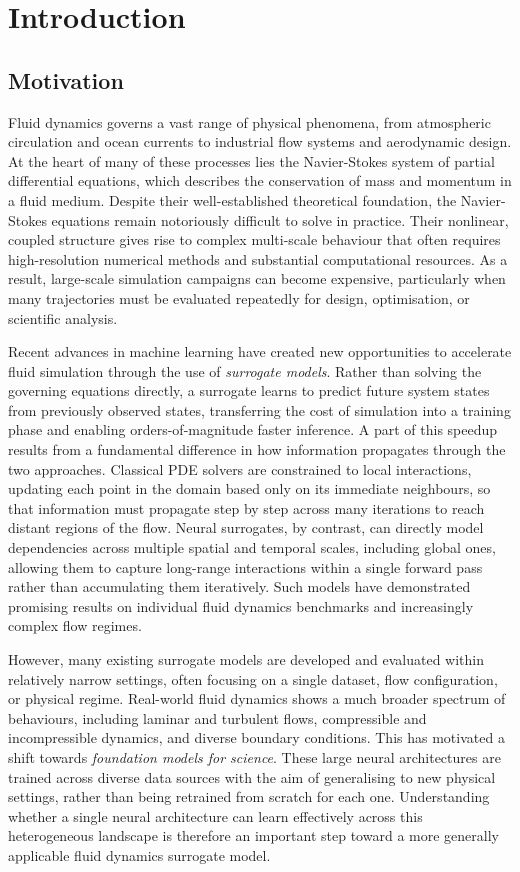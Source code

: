\chapter{Introduction}\label{ch:introduction}

\section{Motivation}
Fluid dynamics governs a vast range of physical phenomena, from atmospheric circulation and ocean currents to industrial flow systems and aerodynamic design. At the heart of many of these processes lies the Navier-Stokes system of partial differential equations, which describes the conservation of mass and momentum in a fluid medium. Despite their well-established theoretical foundation, the Navier-Stokes equations remain notoriously difficult to solve in practice. Their nonlinear, coupled structure gives rise to complex multi-scale behaviour that often requires high-resolution numerical methods and substantial computational resources. As a result, large-scale simulation campaigns can become expensive, particularly when many trajectories must be evaluated repeatedly for design, optimisation, or scientific analysis.

Recent advances in machine learning have created new opportunities to accelerate fluid simulation through the use of \emph{surrogate models}. Rather than solving the governing equations directly, a surrogate learns to predict future system states from previously observed states, transferring the cost of simulation into a training phase and enabling orders-of-magnitude faster inference. A part of this speedup results from a fundamental difference in how information propagates through the two approaches. Classical PDE solvers are constrained to local interactions, updating each point in the domain based only on its immediate neighbours, so that information must propagate step by step across many iterations to reach distant regions of the flow. Neural surrogates, by contrast, can directly model dependencies across multiple spatial and temporal scales, including global ones, allowing them to capture long-range interactions within a single forward pass rather than accumulating them iteratively. Such models have demonstrated promising results on individual fluid dynamics benchmarks and increasingly complex flow regimes.

However, many existing surrogate models are developed and evaluated within relatively narrow settings, often focusing on a single dataset, flow configuration, or physical regime. Real-world fluid dynamics shows a much broader spectrum of behaviours, including laminar and turbulent flows, compressible and incompressible dynamics, and diverse boundary conditions. This has motivated a shift towards \emph{foundation models for science}. These large neural architectures are trained across diverse data sources with the aim of generalising to new physical settings, rather than being retrained from scratch for each one. Understanding whether a single neural architecture can learn effectively across this heterogeneous landscape is therefore an important step toward a more generally applicable fluid dynamics surrogate model.

